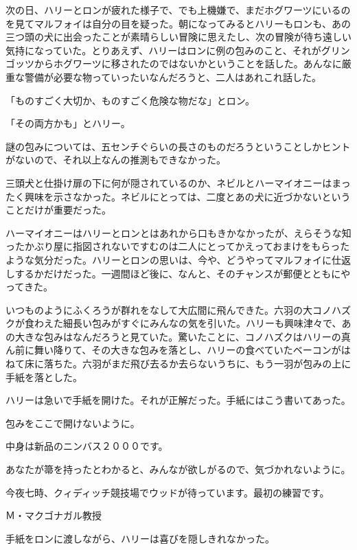 \documentclass[10pt,a4paper]{article}
\begin{document}
\begin{CJK}{UTF8}{min}
次の日、ハリーとロンが疲れた様子で、でも上機嫌で、まだホグワーツにいるのを見てマルフォイは自分の目を疑った。朝になってみるとハリーもロンも、あの三つ頭の犬に出会ったことが素晴らしい冒険に思えたし、次の冒険が待ち遠しい気持になっていた。とりあえず、ハリーはロンに例の包みのこと、それがグリンゴッツからホグワーツに移されたのではないかということを話した。あんなに厳重な警備が必要な物っていったいなんだろうと、二人はあれこれ話した。

「ものすごく大切か、ものすごく危険な物だな」とロン。

「その両方かも」とハリー。

謎の包みについては、五センチぐらいの長さのものだろうということしかヒントがないので、それ以上なんの推測もできなかった。

三頭犬と仕掛け扉の下に何が隠されているのか、ネビルとハーマイオニーはまったく興味を示さなかった。ネビルにとっては、二度とあの犬に近づかないということだけが重要だった。

ハーマイオニーはハリーとロンとはあれから口もきかなかったが、えらそうな知ったかぶり屋に指図されないですむのは二人にとってかえっておまけをもらったような気分だった。ハリーとロンの思いは、今や、どうやってマルフォイに仕返しするかだけだった。一週間ほど後に、なんと、そのチャンスが郵便とともにやってきた。

いつものようにふくろうが群れをなして大広間に飛んできた。六羽の大コノハズクが食わえた細長い包みがすぐにみんなの気を引いた。ハリーも興味津々で、あの大きな包みはなんだろうと見ていた。驚いたことに、コノハズクはハリーの真ん前に舞い降りて、その大きな包みを落とし、ハリーの食べていたベーコンがはねて床に落ちた。六羽がまだ飛び去るか去らないうちに、もう一羽が包みの上に手紙を落とした。

ハリーは急いで手紙を開けた。それが正解だった。手紙にはこう書いてあった。





包みをここで開けないように。

中身は新品のニンバス２０００です。

あなたが箒を持ったとわかると、みんなが欲しがるので、気づかれないように。

今夜七時、クィディッチ競技場でウッドが待っています。最初の練習です。



Ｍ・マクゴナガル教授





手紙をロンに渡しながら、ハリーは喜びを隠しきれなかった。


\end{CJK}
\end{document}
